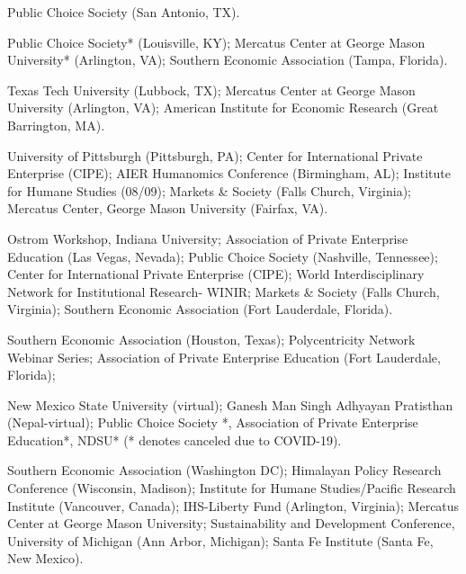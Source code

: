 \documentclass[12pt,letterpaper]{report}
\begin{document}

    \begin{tablist}

        \item [2026] \tab Public Choice Society (San Antonio, TX).

        \item [2025] \tab Public Choice Society* (Louisville, KY); Mercatus Center at George Mason University* (Arlington, VA); Southern Economic Association (Tampa, Florida).

        \item[2024] \tab Texas Tech University (Lubbock, TX); Mercatus Center at George Mason University (Arlington, VA); American Institute for Economic Research (Great Barrington, MA).

        \item[2023] \tab University of Pittsburgh (Pittsburgh, PA); Center for International Private Enterprise (CIPE); AIER Humanomics Conference (Birmingham, AL); Institute for Humane Studies (08/09); Markets \&  Society (Falls Church, Virginia); Mercatus Center, George Mason University (Fairfax, VA).

        \item[2022] \tab Ostrom Workshop, Indiana University; Association of Private Enterprise Education (Las Vegas, Nevada); Public Choice Society (Nashville, Tennessee); Center for International Private Enterprise (CIPE); World Interdisciplinary Network for Institutional Research- WINIR; Markets \&  Society (Falls Church, Virginia); Southern Economic Association (Fort Lauderdale, Florida).

        \item[2021] \tab Southern Economic Association (Houston, Texas); Polycentricity Network Webinar Series; Association of Private Enterprise Education (Fort Lauderdale, Florida);

        \item[2020] \tab New Mexico State University (virtual); Ganesh Man Singh Adhyayan Pratisthan (Nepal-virtual); Public Choice Society *, Association of Private Enterprise Education*, NDSU* (* denotes canceled due to COVID-19).

      \item[2018] \tab Southern Economic Association (Washington DC); Himalayan Policy Research Conference (Wisconsin, Madison); Institute for Humane Studies/Pacific Research Institute (Vancouver, Canada); IHS-Liberty Fund (Arlington, Virginia); Mercatus Center at George Mason University; Sustainability and Development Conference, University of Michigan (Ann Arbor, Michigan); Santa Fe Institute (Santa Fe, New Mexico).


    \end{tablist}
\end{document}
